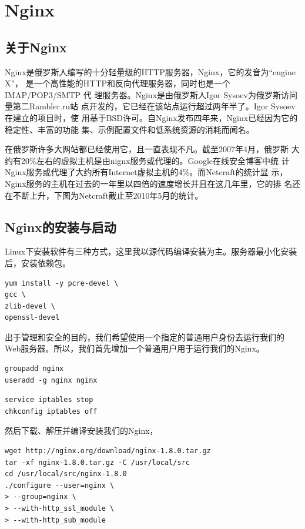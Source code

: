 \section{Nginx}
\label{sec:nginx}

\subsection{关于Nginx}
\label{subsec:AboutNginx}

Nginx是俄罗斯人编写的十分轻量级的HTTP服务器，Nginx，它的发音为“engine
X”， 是一个高性能的HTTP和反向代理服务器，同时也是一个IMAP/POP3/SMTP 代
理服务器。Nginx是由俄罗斯人Igor Sysoev为俄罗斯访问量第二Rambler.ru站
点开发的，它已经在该站点运行超过两年半了。Igor Sysoev在建立的项目时，使
用基于BSD许可。自Nginx发布四年来，Nginx已经因为它的稳定性、丰富的功能
集、示例配置文件和低系统资源的消耗而闻名。

在俄罗斯许多大网站都已经使用它，且一直表现不凡。截至2007年4月，俄罗斯
大约有20\%左右的虚拟主机是由nignx服务或代理的。Google在线安全博客中统
计Nginx服务或代理了大约所有Internet虚拟主机的4\%。而Netcraft的统计显
示，Nginx服务的主机在过去的一年里以四倍的速度增长并且在这几年里，它的排
名还在不断上升，下图为Netcraft截止至2010年5月的统计。

\subsection{Nginx的安装与启动}
\label{subsec:InstallAndStartNginx}

Linux下安装软件有三种方式，这里我以源代码编译安装为主。服务器最小化安装
后，安装依赖包。

\begin{verbatim}
yum install -y pcre-devel \
gcc \
zlib-devel \
openssl-devel
\end{verbatim}

出于管理和安全的目的，我们希望使用一个指定的普通用户身份去运行我们的
Web服务器。所以，我们首先增加一个普通用户用于运行我们的Nginx。

\begin{verbatim}
groupadd nginx
useradd -g nginx nginx
\end{verbatim}

\begin{verbatim}
service iptables stop
chkconfig iptables off
\end{verbatim}

然后下载、解压并编译安装我们的Nginx，

\begin{verbatim}
wget http://nginx.org/download/nginx-1.8.0.tar.gz
tar -xf nginx-1.8.0.tar.gz -C /usr/local/src
cd /usr/local/src/nginx-1.8.0
./configure --user=nginx \
> --group=nginx \
> --with-http_ssl_module \
> --with-http_sub_module
\end{verbatim}

